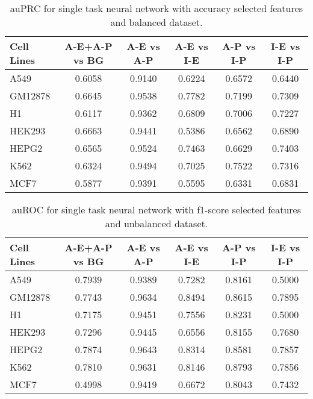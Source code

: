 \begin{table}[!htbp]
\centering
\caption{auPRC for single task neural network with accuracy selected features and balanced dataset.}
\label{tab:balanced_old_auprc}
\begin{tabular}[t]{l*{5}{c}}
\toprule
Cell Lines & A-E+A-P vs BG & A-E vs A-P & A-E vs I-E & A-P vs I-P & I-E vs I-P \\
\midrule
A549  & 0.6058 & 0.9140 & 0.6224 & 0.6572 & 0.6440\\
GM12878  & 0.6645 & 0.9538 & 0.7782 & 0.7199 & 0.7309\\
H1  & 0.6117 & 0.9362 & 0.6809 & 0.7006 & 0.7227\\
HEK293  & 0.6663 & 0.9441 & 0.5386 & 0.6562 & 0.6890\\
HEPG2  & 0.6565 & 0.9524 & 0.7463 & 0.6629 & 0.7403\\
K562  & 0.6324 & 0.9494 & 0.7025 & 0.7522 & 0.7316\\
MCF7  & 0.5877 & 0.9391 & 0.5595 & 0.6331 & 0.6831\\
\bottomrule
\end{tabular}
\end{table}
\begin{table}[!htbp]
\centering
\caption{auROC for single task neural network with f1-score selected features and unbalanced dataset.}
\label{tab:unbalanced_new_auroc}
\begin{tabular}[t]{l*{5}{c}}
\toprule
Cell Lines & A-E+A-P vs BG & A-E vs A-P & A-E vs I-E & A-P vs I-P & I-E vs I-P \\
\midrule
A549  & 0.7939 & 0.9389 & 0.7282 & 0.8161 & 0.5000\\
GM12878  & 0.7743 & 0.9634 & 0.8494 & 0.8615 & 0.7895\\
H1  & 0.7175 & 0.9451 & 0.7556 & 0.8231 & 0.5000\\
HEK293  & 0.7296 & 0.9445 & 0.6556 & 0.8155 & 0.7680\\
HEPG2  & 0.7874 & 0.9643 & 0.8314 & 0.8581 & 0.7857\\
K562  & 0.7810 & 0.9631 & 0.8146 & 0.8793 & 0.7856\\
MCF7  & 0.4998 & 0.9419 & 0.6672 & 0.8043 & 0.7432\\
\bottomrule
\end{tabular}
\end{table}


